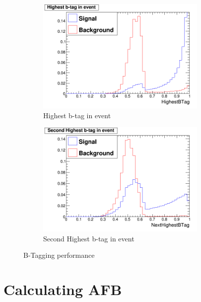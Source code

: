 \begin{figure}
  \centering
  \begin{subfigure}{.5\textwidth}
    \centering
    \includegraphics[width=0.9\textwidth]{figures/HighestBTag_SigVsBkg.png}
    \caption[Highest b-tag in event]{Highest b-tag in event}
  \end{subfigure}%
  \begin{subfigure}{.5\textwidth}
    \centering
    \includegraphics[width=0.9\textwidth]{figures/NextHighestBTag_SigVsBkg.png}
    \caption[Second Highest b-tag event in event]{Second Highest b-tag in event}
  \end{subfigure}
  \caption[B-Tagging performance]{B-Tagging performance}
  \label{fig:btagging}
\end{figure}




\section{Calculating AFB}
\label{Calculating AFB}

